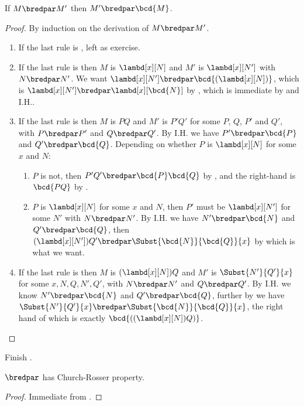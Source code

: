 \documentclass[../../../include/open-logic-section]{subfiles}
\begin{document}
\begin{lem}
  If $M \bredpar M'$ then $M' \bredpar \bcd{M}$.
\end{lem}
\begin{proof}
  By induction on the derivation of $M \bredpar M'$.
  \begin{enumerate}
    \item If the last rule is , left as exercise. 
    \item If the last rule is  then $M$ is 
      $\lambd[x][N]$ and $M'$ is $\lambd[x][N']$ with
      $N \bredpar N'$. We want $\lambd[x][N'] \bredpar
      \bcd{(\lambd[x][N])}$, which is $\lambd[x][N'] \bredpar
      \lambd[x][\bcd{N}]$ by , which is immediate by
       and I.H.. 
    \item If the last rule is  then $M$ is 
      $PQ$ and $M'$ is $P'Q'$ for some $P$, $Q$, $P'$ and $Q'$, with $P \bredpar P'$
      and $Q \bredpar Q'$. By I.H. we have $P' \bredpar \bcd{P}$ and
      $Q' \bredpar \bcd{Q}$.  Depending on whether $P$ is 
      $\lambd[x][N]$ for some $x$ and $N$:
      \begin{enumerate}
        \item $P$ is not, then $P'Q' \bredpar \bcd{P}\bcd{Q}$ by
          , and the right-hand is $\bcd{PQ}$ by .
        \item $P$ is $\lambd[x][N]$ for some $x$ and $N$, then
          $P'$ must be $\lambd[x][N']$ for some $N'$ with 
          $N \bredpar N'$. By I.H. we have $N' \bredpar \bcd{N}$ and
          $Q' \bredpar \bcd{Q}$, then $(\lambd[x][N'])Q' \bredpar
          \Subst{\bcd{N}}{\bcd{Q}}{x}$ by  which is what
          we want.
      \end{enumerate}
    \item If the last rule is  then $M$ is 
      $(\lambd[x][N])Q$  and $M'$ is $\Subst{N'}{Q'}{x}$
      for some $x, N, Q, N', Q'$, with $N \bredpar N'$ and $Q
      \bredpar Q'$. By I.H. we know $N' \bredpar \bcd{N}$ and $Q'
      \bredpar \bcd{Q}$, further by  we have
      $\Subst{N'}{Q'}{x} \bredpar \Subst{\bcd{N}}{\bcd{Q}}{x}$, the
      right hand of which is exactly $\bcd{((\lambd[x][N])Q)}$.
  \end{enumerate}
\end{proof}

\begin{prob}
  Finish .
\end{prob}

\begin{thm}
  $\bredpar$ has Church-Rosser property.
\end{thm}
\begin{proof}
  Immediate from .
\end{proof}
\end{document}
